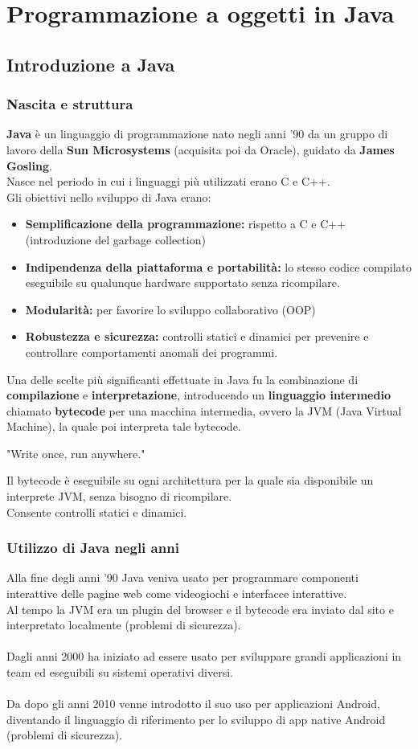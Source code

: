 \documentclass[12pt,a4paper]{article}
\let\oldsection\section
\renewcommand{\section}{\clearpage\oldsection}
\begin{document}
\section{Programmazione a oggetti in Java}
\subsection{Introduzione a Java}
\subsubsection{Nascita e struttura}
\textbf{Java} è un linguaggio di programmazione nato negli anni '90 da un gruppo di lavoro della \textbf{Sun Microsystems} (acquisita poi da Oracle), guidato da \textbf{James Gosling}.\\
Nasce nel periodo in cui i linguaggi più utilizzati erano C e C++.\\
Gli obiettivi nello sviluppo di Java erano:
\begin{itemize}
  \item \textbf{Semplificazione della programmazione:} rispetto a C e C++ (introduzione del garbage collection)
  \item \textbf{Indipendenza della piattaforma e portabilità:} lo stesso codice compilato eseguibile su qualunque hardware supportato senza ricompilare.
  \item \textbf{Modularità:} per favorire lo sviluppo collaborativo (OOP)
  \item \textbf{Robustezza e sicurezza:} controlli statici e dinamici per prevenire e controllare comportamenti anomali dei programmi.
\end{itemize}
Una delle scelte più significanti effettuate in Java fu la combinazione di \textbf{compilazione} e \textbf{interpretazione}, introducendo un \textbf{linguaggio intermedio} chiamato \textbf{bytecode} per una macchina intermedia, ovvero la JVM (Java Virtual Machine), la quale poi interpreta tale bytecode.
\begin{center}
  "Write once, run anywhere."
\end{center}
Il bytecode è eseguibile su ogni architettura per la quale sia disponibile un interprete JVM, senza bisogno di ricompilare.\\
Consente controlli statici e dinamici.\\
\subsubsection{Utilizzo di Java negli anni}
Alla fine degli anni '90 Java veniva usato per programmare componenti interattive delle pagine web come videogiochi e interfacce interattive.\\
Al tempo la JVM era un plugin del browser e il bytecode era inviato dal sito e interpretato localmente (problemi di sicurezza).\\\\
Dagli anni 2000 ha iniziato ad essere usato per sviluppare grandi applicazioni in team ed eseguibili su sistemi operativi diversi.\\\\
Da dopo gli anni 2010 venne introdotto il suo uso per applicazioni Android, diventando il linguaggio di riferimento per lo sviluppo di app native Android (problemi di sicurezza).
\end{document}
